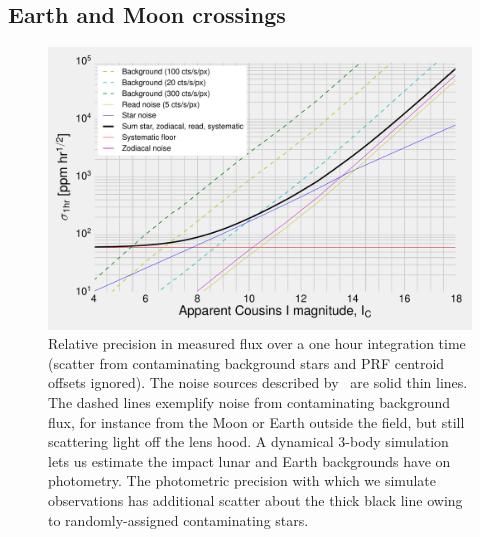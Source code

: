 \subsection{Earth and Moon crossings}
\label{sec:earth_moon_crossings}
\begin{figure}[!tb]
	\centering
	\includegraphics{figures/precision_memo.pdf}
	\caption{Relative precision in measured flux over a one hour integration time (scatter from contaminating background stars and PRF centroid offsets ignored). The noise sources described by~\citet{Sullivan_2015} are solid thin lines. The dashed lines exemplify noise from contaminating background flux, for instance from the Moon or Earth outside the \tess field, but still scattering light off  the \tess lens hood. A dynamical 3-body simulation lets us estimate the impact  lunar and Earth backgrounds have on \tesss photometry.
	The photometric precision with which we simulate observations has additional scatter about the thick black line owing to randomly-assigned contaminating stars.}
	\label{fig:noise_with_moon}
\end{figure}

